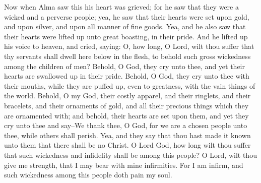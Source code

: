 Now when Alma saw this his heart was grieved; for he saw that they were a wicked and a perverse people; yea, he saw that their hearts were set upon gold, and upon silver, and upon all manner of fine goods.
\bverse \iffalse Yea, and he also saw that their hearts were lifted up unto great boasting, in their pride. \fi
Yea, and he also saw that their hearts were lifted up unto great boasting, in their pride.
\bverse \iffalse And he lifted up his voice to heaven, and cried, saying: O, how long, O Lord, wilt thou suffer that thy servants shall dwell here below in the flesh, to behold such gross wickedness among the children of men? \fi
And he lifted up his voice to heaven, and cried, saying: O, how long, O Lord, wilt thou suffer that thy servants shall dwell here below in the flesh, to behold such gross wickedness among the children of men?
\bverse \iffalse Behold, O God, they cry unto thee, and yet their hearts are swallowed up in their pride. Behold, O God, they cry unto thee with their mouths, while they are puffed up, even to greatness, with the vain things of the world. \fi
Behold, O God, they cry unto thee, and yet their hearts are swallowed up in their pride. Behold, O God, they cry unto thee with their mouths, while they are puffed up, even to greatness, with the vain things of the world.
\bverse \iffalse Behold, O my God, their costly apparel, and their ringlets, and their bracelets, and their ornaments of gold, and all their precious things which they are ornamented with; and behold, their hearts are set upon them, and yet they cry unto thee and say--We thank thee, O God, for we are a chosen people unto thee, while others shall perish. \fi
Behold, O my God, their costly apparel, and their ringlets, and their bracelets, and their ornaments of gold, and all their precious things which they are ornamented with; and behold, their hearts are set upon them, and yet they cry unto thee and say--We thank thee, O God, for we are a chosen people unto thee, while others shall perish.
\bverse \iffalse Yea, and they say that thou hast made it known unto them that there shall be no Christ. \fi
Yea, and they say that thou hast made it known unto them that there shall be no Christ.
\bverse \iffalse O Lord God, how long wilt thou suffer that such wickedness and infidelity shall be among this people? O Lord, wilt thou give me strength, that I may bear with mine infirmities. For I am infirm, and such wickedness among this people doth pain my soul. \fi
O Lord God, how long wilt thou suffer that such wickedness and infidelity shall be among this people? O Lord, wilt thou give me strength, that I may bear with mine infirmities. For I am infirm, and such wickedness among this people doth pain my soul.
